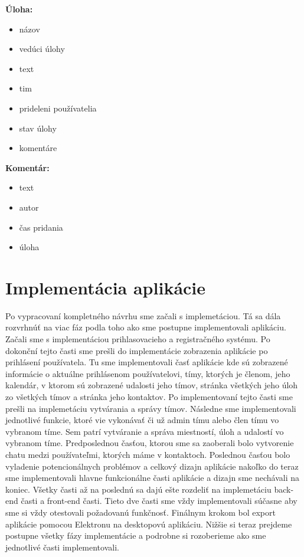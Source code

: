 \textbf{Úloha:}
\indent\begin{itemize}
    \item názov
    \item vedúci úlohy
    \item text
    \item tim
    \item prideleni používatelia
    \item stav úlohy
    \item komentáre
\end{itemize}

\textbf{Komentár:}
\indent\begin{itemize}
    \item text
    \item autor
    \item čas pridania
    \item úloha
\end{itemize} 

\section{Implementácia aplikácie}
\indent Po vypracovaní kompletného návrhu sme začali s implemetáciou. Tá sa dála rozvrhnúť na viac fáz podla toho ako sme postupne implementovali aplikáciu. Začali sme s implementáciou prihlasovacieho a registračného systému. Po dokonční tejto časti sme prešli do implementácie zobrazenia aplikácie po prihlásení používatela. Tu sme implementovali časť aplikácie kde sú zobrazené informácie o aktuálne prihlásenom používatelovi, tímy, ktorých je členom, jeho kalendár, v ktorom sú zobrazené udalosti jeho tímov, stránka všetkých jeho úloh zo všetkých tímov a stránka jeho kontaktov. Po implementovaní tejto časti sme prešli na implemetáciu vytvárania a správy tímov. Následne sme implementovali jednotlivé funkcie, ktoré vie vykonávať či už admin tímu alebo člen tímu vo vybranom tíme. Sem patrí vytváranie a správa miestností, úloh a udalostí vo vybranom tíme. Predposlednou časťou, ktorou sme sa zaoberali bolo vytvorenie chatu medzi používateľmi, ktorých máme v kontaktoch. Poslednou časťou bolo vyladenie potencionálnych problémov a celkový dizajn aplikácie nakoľko do teraz sme implementovali hlavne funkcionálne časti aplikácie a dizajn sme nechávali na koniec. Všetky časti až na poslednú sa dajú ešte rozdeliť na implemetáciu back-end časti a front-end časti. Tieto dve časti sme vždy implementovali súčasne aby sme si vždy otestovali požadovanú funkčnosť. Finálnym krokom bol export aplikácie pomocou Elektronu na desktopovú aplikáciu. Nižšie si teraz prejdeme postupne všetky fázy implementácie a podrobne si rozoberieme ako sme jednotlivé časti implementovali.

